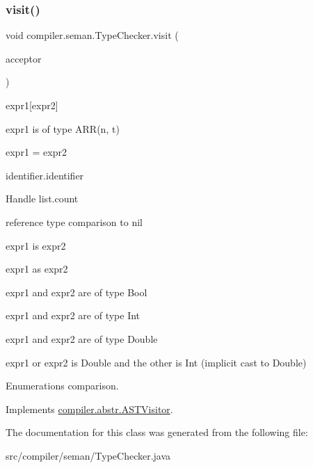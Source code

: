 \subsubsection{\texorpdfstring{visit()}{visit()}}
{\footnotesize\ttfamily void compiler.\+seman.\+Type\+Checker.\+visit (\begin{DoxyParamCaption}\item[{\hyperlink{classcompiler_1_1abstr_1_1tree_1_1expr_1_1_abs_bin_expr}{Abs\+Bin\+Expr}}]{acceptor }\end{DoxyParamCaption})}

expr1\mbox{[}expr2\mbox{]}

expr1 is of type A\+R\+R(n, t)

expr1 = expr2

identifier.\+identifier

Handle list.\+count

reference type comparison to nil

expr1 is expr2

expr1 as expr2

expr1 and expr2 are of type Bool

expr1 and expr2 are of type Int

expr1 and expr2 are of type Double

expr1 or expr2 is Double and the other is Int (implicit cast to Double)

Enumerations comparison.

Implements \hyperlink{interfacecompiler_1_1abstr_1_1_a_s_t_visitor}{compiler.\+abstr.\+A\+S\+T\+Visitor}.



The documentation for this class was generated from the following file\+:\begin{DoxyCompactItemize}
\item 
src/compiler/seman/Type\+Checker.\+java\end{DoxyCompactItemize}
